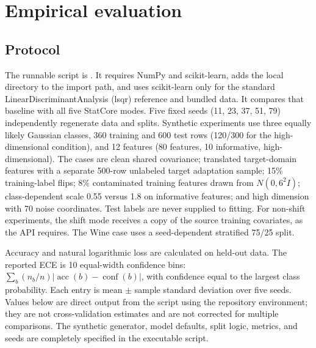 \documentclass[conference]{IEEEtran}
\begin{document}
\section{Empirical evaluation}
\subsection{Protocol}
The runnable script is . It requires NumPy and scikit-learn, adds the local  directory to the import path, and uses scikit-learn only for the standard LinearDiscriminantAnalysis (lsqr) reference and bundled  data. It compares that baseline with all five StatCore modes. Five fixed seeds (11, 23, 37, 51, 79) independently regenerate data and splits. Synthetic experiments use three equally likely Gaussian classes, 360 training and 600 test rows (120/300 for the high-dimensional condition), and 12 features (80 features, 10 informative, high-dimensional). The cases are clean shared covariance; translated target-domain features with a separate 500-row unlabeled target adaptation sample; 15\% training-label flips; 8\% contaminated training features drawn from \(N(0,6^2I)\); class-dependent scale 0.55 versus 1.8 on informative features; and high dimension with 70 noise coordinates. Test labels are never supplied to fitting. For non-shift experiments, the shift mode receives a copy of the source training covariates, as the API requires. The Wine case uses a seed-dependent stratified 75/25 split.

Accuracy and natural logarithmic loss are calculated on held-out data. The reported ECE is 10 equal-width confidence bins: \(\sum_b(n_b/n)|\operatorname{acc}(b)-\operatorname{conf}(b)|\), with confidence equal to the largest class probability. Each entry is mean \(\pm\) sample standard deviation over five seeds. Values below are direct output from the script using the repository environment; they are not cross-validation estimates and are not corrected for multiple comparisons. The synthetic generator, model defaults, split logic, metrics, and seeds are completely specified in the executable script.
\end{document}
